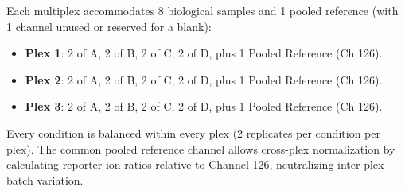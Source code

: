 \documentclass[11pt,twoside,openright]{book}
\begin{document}
Each multiplex accommodates 8 biological samples and 1 pooled reference (with 1 channel unused or reserved for a blank):
\begin{itemize}
    \item \textbf{Plex 1}: 2 of A, 2 of B, 2 of C, 2 of D, plus 1 Pooled Reference (Ch 126).
    \item \textbf{Plex 2}: 2 of A, 2 of B, 2 of C, 2 of D, plus 1 Pooled Reference (Ch 126).
    \item \textbf{Plex 3}: 2 of A, 2 of B, 2 of C, 2 of D, plus 1 Pooled Reference (Ch 126).
\end{itemize}
Every condition is balanced within every plex (2 replicates per condition per plex). The common pooled reference channel allows cross-plex normalization by calculating reporter ion ratios relative to Channel 126, neutralizing inter-plex batch variation.

\end{document}
